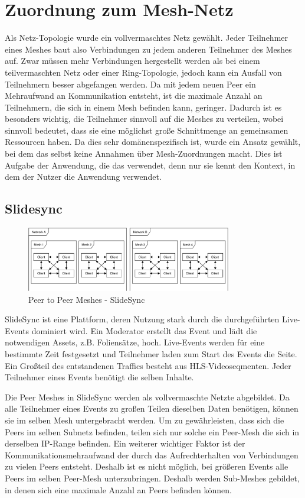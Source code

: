 \section{Zuordnung zum Mesh-Netz}\label{k:meshing}
Als Netz-Topologie wurde ein vollvermaschtes Netz gewählt. Jeder Teilnehmer eines Meshes baut also Verbindungen zu jedem anderen Teilnehmer des Meshes auf. Zwar müssen mehr Verbindungen hergestellt werden als bei einem teilvermaschten Netz oder einer Ring-Topologie, jedoch kann ein Ausfall von Teilnehmern besser abgefangen werden. Da mit jedem neuen Peer ein Mehraufwand an Kommunikation entsteht, ist die maximale Anzahl an Teilnehmern, die sich in einem Mesh befinden kann, geringer. Dadurch ist es besonders wichtig, die Teilnehmer sinnvoll auf die Meshes zu verteilen, wobei sinnvoll bedeutet, dass sie eine möglichst große Schnittmenge an gemeinsamen Ressourcen haben. Da dies sehr domänenspezifisch ist, wurde ein Ansatz gewählt, bei dem das \cdn selbst keine Annahmen über Mesh-Zuordnungen macht. Dies ist Aufgabe der Anwendung, die das \cdn verwendet, denn nur sie kennt den Kontext, in dem der Nutzer die Anwendung verwendet.

\subsection{Slidesync}
\begin{figure}[!h]
	\centering
	\includegraphics[width=0.8\textwidth]{figures/slidesync_peer_meshes}
	\caption[A Figure Short-Title]{Peer to Peer Meshes - SlideSync}
	\label{fig:mesh-slidesync}
\end{figure}

SlideSync ist eine Plattform, deren Nutzung stark durch die durchgeführten Live-Events dominiert wird. Ein Moderator erstellt das Event und lädt die notwendigen Assets, z.B. Foliensätze, hoch. Live-Events werden für eine bestimmte Zeit festgesetzt und Teilnehmer laden zum Start des Events die Seite. Ein Großteil des entstandenen Traffics besteht aus HLS-Videoseqmenten. Jeder Teilnehmer eines Events benötigt die selben Inhalte.

Die Peer Meshes in SlideSync werden als vollvermaschte Netzte abgebildet. Da alle Teilnehmer eines Events zu großen Teilen dieselben Daten benötigen, können sie im selben Mesh untergebracht werden. Um zu gewährleisten, dass sich die Peers im selben Subnetz befinden, teilen sich nur solche ein Peer-Mesh die sich in derselben IP-Range befinden. Ein weiterer wichtiger Faktor ist der Kommunikationsmehraufwand der durch das Aufrechterhalten von Verbindungen zu vielen Peers entsteht. Deshalb ist es nicht möglich, bei größeren Events alle Peers im selben Peer-Mesh unterzubringen. Deshalb werden Sub-Meshes gebildet, in denen sich eine maximale Anzahl an Peers befinden können.

